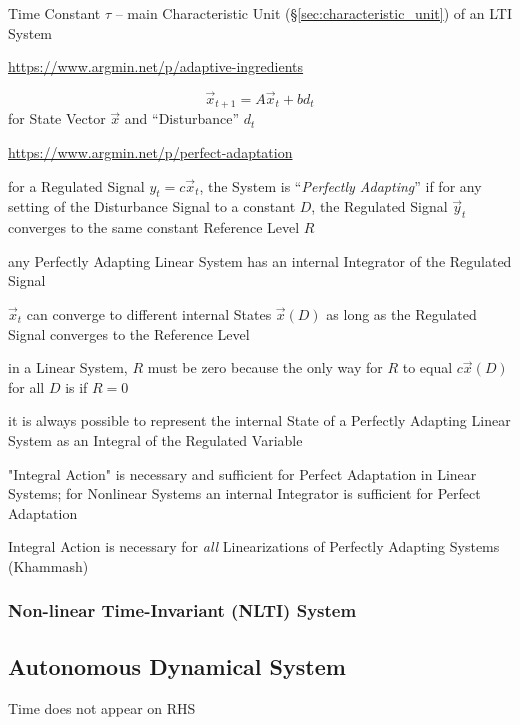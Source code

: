 Time Constant $\tau$ -- main Characteristic Unit
(\S\ref{sec:characteristic_unit}) of an LTI System

\url{https://www.argmin.net/p/adaptive-ingredients}

\[
  \vec{x}_{t+1} = A \vec{x}_t + b d_t
\]
for State Vector $\vec{x}$ and ``Disturbance'' $d_t$

\url{https://www.argmin.net/p/perfect-adaptation}

for a Regulated Signal $y_t = c \vec{x}_t$, the System is
``\emph{Perfectly Adapting}'' if for any setting of the Disturbance Signal to a
constant $D$, the Regulated Signal $\vec{y}_t$ converges to the same constant
Reference Level $R$

any Perfectly Adapting Linear System has an internal Integrator of the Regulated
Signal

$\vec{x}_t$ can converge to different internal States $\vec{x}(D)$ as long as
the Regulated Signal converges to the Reference Level

in a Linear System, $R$ must be zero because the only way for $R$ to equal
$c \vec{x}(D)$ for all $D$ is if $R = 0$

it is always possible to represent the internal State of a Perfectly Adapting
Linear System as an Integral of the Regulated Variable

"Integral Action" is necessary and sufficient for Perfect Adaptation in Linear
Systems; for Nonlinear Systems an internal Integrator is sufficient for Perfect
Adaptation

Integral Action is necessary for \emph{all} Linearizations of Perfectly Adapting
Systems (Khammash)



\subsubsection{Non-linear Time-Invariant (NLTI) System}\label{sec:nlti_system}



\subsection{Autonomous Dynamical System}\label{sec:autonomous_dynamical_system}

Time does not appear on RHS

